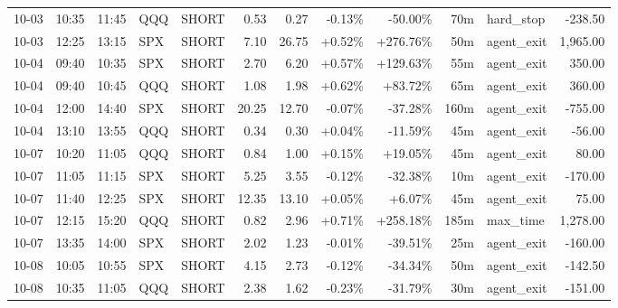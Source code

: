 \documentclass[11pt,a4paper,twoside]{article}
\begin{document}
\begin{center}
\begin{longtable}{>{\color{txtmain}}l l l l l r r r r r >{\color{txtmain}}l r}
10-03 & 10:35 & 11:45 & QQQ & SHORT & 0.53 & 0.27 & \textcolor{lossred}{-0.13\%} & \textcolor{lossred}{-50.00\%} & 70m & hard\_stop & \textcolor{lossred}{-238.50} \\
10-03 & 12:25 & 13:15 & SPX & SHORT & 7.10 & 26.75 & \textcolor{wingreen}{+0.52\%} & \textcolor{wingreen}{+276.76\%} & 50m & agent\_exit & \textcolor{wingreen}{1,965.00} \\
10-04 & 09:40 & 10:35 & SPX & SHORT & 2.70 & 6.20 & \textcolor{wingreen}{+0.57\%} & \textcolor{wingreen}{+129.63\%} & 55m & agent\_exit & \textcolor{wingreen}{350.00} \\
10-04 & 09:40 & 10:45 & QQQ & SHORT & 1.08 & 1.98 & \textcolor{wingreen}{+0.62\%} & \textcolor{wingreen}{+83.72\%} & 65m & agent\_exit & \textcolor{wingreen}{360.00} \\
10-04 & 12:00 & 14:40 & SPX & SHORT & 20.25 & 12.70 & \textcolor{lossred}{-0.07\%} & \textcolor{lossred}{-37.28\%} & 160m & agent\_exit & \textcolor{lossred}{-755.00} \\
10-04 & 13:10 & 13:55 & QQQ & SHORT & 0.34 & 0.30 & \textcolor{wingreen}{+0.04\%} & \textcolor{lossred}{-11.59\%} & 45m & agent\_exit & \textcolor{lossred}{-56.00} \\
10-07 & 10:20 & 11:05 & QQQ & SHORT & 0.84 & 1.00 & \textcolor{wingreen}{+0.15\%} & \textcolor{wingreen}{+19.05\%} & 45m & agent\_exit & \textcolor{wingreen}{80.00} \\
10-07 & 11:05 & 11:15 & SPX & SHORT & 5.25 & 3.55 & \textcolor{lossred}{-0.12\%} & \textcolor{lossred}{-32.38\%} & 10m & agent\_exit & \textcolor{lossred}{-170.00} \\
10-07 & 11:40 & 12:25 & SPX & SHORT & 12.35 & 13.10 & \textcolor{wingreen}{+0.05\%} & \textcolor{wingreen}{+6.07\%} & 45m & agent\_exit & \textcolor{wingreen}{75.00} \\
10-07 & 12:15 & 15:20 & QQQ & SHORT & 0.82 & 2.96 & \textcolor{wingreen}{+0.71\%} & \textcolor{wingreen}{+258.18\%} & 185m & max\_time & \textcolor{wingreen}{1,278.00} \\
10-07 & 13:35 & 14:00 & SPX & SHORT & 2.02 & 1.23 & \textcolor{lossred}{-0.01\%} & \textcolor{lossred}{-39.51\%} & 25m & agent\_exit & \textcolor{lossred}{-160.00} \\
10-08 & 10:05 & 10:55 & SPX & SHORT & 4.15 & 2.73 & \textcolor{lossred}{-0.12\%} & \textcolor{lossred}{-34.34\%} & 50m & agent\_exit & \textcolor{lossred}{-142.50} \\
10-08 & 10:35 & 11:05 & QQQ & SHORT & 2.38 & 1.62 & \textcolor{lossred}{-0.23\%} & \textcolor{lossred}{-31.79\%} & 30m & agent\_exit & \textcolor{lossred}{-151.00} \\

\end{longtable}
\end{center}
\end{document}
